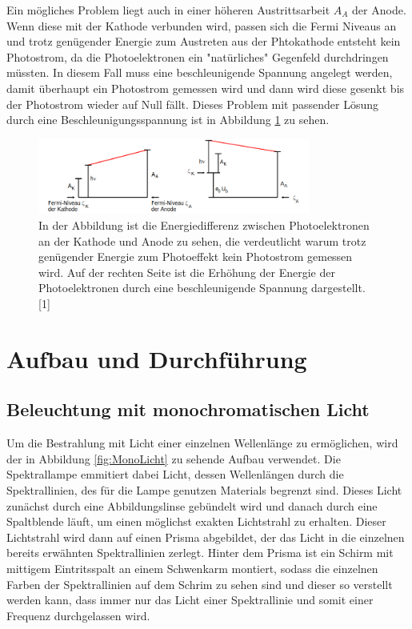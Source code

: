 \documentclass[titlepage = firstcover]{scrartcl}
\begin{document}
        \noindent
        Ein mögliches Problem liegt auch in einer höheren Austrittsarbeit $A_A$ der Anode. Wenn diese mit der Kathode verbunden wird, passen sich die Fermi Niveaus an und trotz genügender Energie zum 
        Austreten aus der Phtokathode entsteht kein Photostrom, da die Photoelektronen ein "natürliches" Gegenfeld durchdringen müssten. In diesem Fall muss eine beschleunigende Spannung angelegt 
        werden, damit überhaupt ein Photostrom gemessen wird und dann wird diese gesenkt bis der Photostrom wieder auf Null fällt. Dieses Problem mit passender Lösung durch eine Beschleunigungsspannung
        ist in Abbildung \ref{fig:bSpannung} zu sehen.  

        \FloatBarrier

                \begin{figure}[h]
                  \centering
                  \includegraphics[width = 0.8\textwidth]{Bilder/bSpannug.png}
                  \caption{In der Abbildung ist die Energiedifferenz zwischen Photoelektronen an der Kathode und Anode zu sehen, die verdeutlicht warum trotz genügender Energie zum Photoeffekt kein Photostrom gemessen wird. Auf der rechten Seite ist die Erhöhung der Energie der Photoelektronen durch eine beschleunigende Spannung dargestellt. [1]}
                  \label{fig:bSpannung}
                \end{figure}

        \FloatBarrier

        \noindent

    \newpage
    \section{Aufbau und Durchführung}
        \subsection{Beleuchtung mit monochromatischen Licht}
            Um die Bestrahlung mit Licht einer einzelnen Wellenlänge zu ermöglichen, wird der in Abbildung \ref{fig:MonoLicht} zu sehende Aufbau verwendet. Die Spektrallampe emmitiert dabei Licht, dessen Wellenlängen 
            durch die Spektrallinien, des für die Lampe genutzen Materials begrenzt sind. Dieses Licht zunächst durch eine Abbildungslinse gebündelt wird und danach durch eine Spaltblende läuft, um 
            einen möglichst exakten Lichtstrahl zu erhalten. Dieser Lichtstrahl wird dann auf einen Prisma abgebildet, der das Licht in die einzelnen bereits erwähnten Spektrallinien zerlegt. Hinter 
            dem Prisma ist ein Schirm mit mittigem Eintritsspalt an einem Schwenkarm montiert, sodass die einzelnen Farben der Spektrallinien auf dem Schrim zu sehen sind und dieser so verstellt werden
            kann, dass immer nur das Licht einer Spektrallinie und somit einer Frequenz durchgelassen wird.
            
\end{document}
